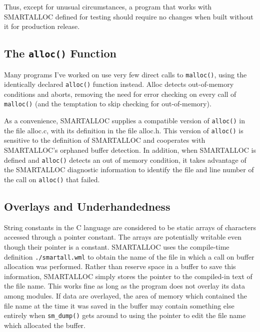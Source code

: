 Thus, except for unusual circumstances, a program that works with SMARTALLOC
defined for testing should require no changes when built without it for
production release.

\subsection{ The {\tt alloc()} Function}

Many programs I've worked on use very few direct calls to {\tt malloc()},
using the identically declared {\tt alloc()} function instead. Alloc detects
out-of-memory conditions and aborts, removing the need for error checking on
every call of {\tt malloc()} (and the temptation to skip checking for
out-of-memory).

As a convenience, SMARTALLOC supplies a compatible version of {\tt alloc()} in
the file alloc.c, with its definition in the file alloc.h. This version of
{\tt alloc()} is sensitive to the definition of SMARTALLOC and cooperates with
SMARTALLOC's orphaned buffer detection. In addition, when SMARTALLOC is
defined and {\tt alloc()} detects an out of memory condition, it takes
advantage of the SMARTALLOC diagnostic information to identify the file and
line number of the call on {\tt alloc()} that failed.

\subsection{ Overlays and Underhandedness}

String constants in the C language are considered to be static arrays of
characters accessed through a pointer constant. The arrays are potentially
writable even though their pointer is a constant. SMARTALLOC uses the
compile-time definition {\tt ./smartall.wml} to obtain the name of the file in
which a call on buffer allocation was performed. Rather than reserve space in
a buffer to save this information, SMARTALLOC simply stores the pointer to the
compiled-in text of the file name. This works fine as long as the program does
not overlay its data among modules. If data are overlayed, the area of memory
which contained the file name at the time it was saved in the buffer may
contain something else entirely when {\tt sm\_dump()} gets around to using the
pointer to edit the file name which allocated the buffer.

